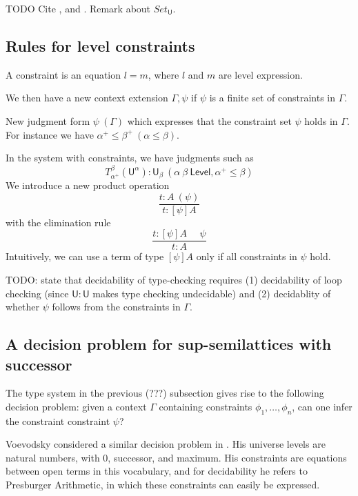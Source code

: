 \documentclass[11pt,a4paper]{article}
\def\UU{\mathsf{U}}
\def\Level{\mathsf{Level}}
\def\Constraint{\mathsf{Constraint}}
\begin{document}
{\color{red}
TODO Cite \cite{giraud:cohom-non-abel}, \cite{chambert-loir:universes-matter} 
and \cite{waterhouse:sheaves}. Remark about $Set_\UU$.}

\subsection{Rules for level constraints}%

A constraint is an equation $l = m$, where $l$ and $m$ are level expression. 

We then have a new context extension $\Gamma,\psi$ if $\psi$ is a finite set of constraints in $\Gamma$.

New judgment form $\psi~(\Gamma)$ which expresses that the constraint set $\psi$
holds in $\Gamma$. For instance we have $\alpha^+\leqslant\beta^+~(\alpha\leqslant\beta)$.

In the system with constraints, we have judgments such as
$$
T_{\alpha^+}^{\beta}(\UU^{\alpha}):\UU_{\beta}~(\alpha~\beta~\Level,\alpha^+\leqslant\beta)
$$
We introduce a new product operation
$$
\frac{t:A~(\psi)}{t:[\psi]A}
$$
with the elimination rule
$$
\frac{t:[\psi]A~~~~~~\psi}{t:A}
$$
Intuitively, we can use a term of type $[\psi]A$ only if all constraints in $\psi$ hold.

{\color{red}
TODO: state that decidability of type-checking requires (1) decidability of loop checking
(since $\UU:\UU$ makes type checking undecidable) and (2) decidablity of whether $\psi$
follows from the constraints in $\Gamma$.}

\subsection{A decision problem for sup-semilattices with successor}

The type system in the previous (???) subsection gives rise to the following
decision problem: given a context $\Gamma$ containing constraints $\phi_1,\ldots,\phi_n$,
can one infer the constraint constraint $\psi$?

Voevodsky considered a similar decision problem in \cite[Section 2]{VV}. 
His universe levels are natural numbers, with 0, successor, and maximum.
His constraints are equations between open terms in this vocabulary, 
and for decidability he refers to Presburger Arithmetic,
in which these constraints can easily be expressed.
\end{document}
